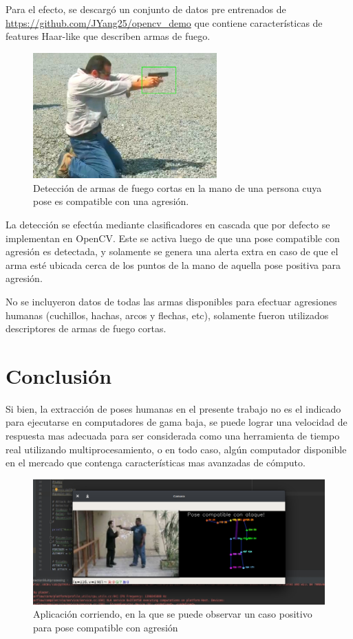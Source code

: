 \documentclass[a4paper,12pt,oneside,spanish]{book}
\begin{document}
Para el efecto, se descargó un conjunto de datos pre entrenados de \url{https://github.com/JYang25/opencv_demo} que contiene características de features Haar-like que describen armas de fuego.

\begin{figure}[h!]
	\includegraphics[width=200pt]{Imagenes/output2.jpg}
	\centering	
	\caption{Detección de armas de fuego cortas en la mano de una persona cuya pose es compatible con una agresión.}
	\label{fig:output2}
\end{figure}

La detección se efectúa mediante clasificadores en cascada que por defecto se implementan en OpenCV. Este se activa luego de que una pose compatible con agresión es detectada, y solamente se genera una alerta extra en caso de que el arma esté ubicada cerca de los puntos de la mano de aquella pose positiva para agresión.\par

No se incluyeron datos de todas las armas disponibles para efectuar agresiones humanas (cuchillos, hachas, arcos y flechas, etc), solamente fueron utilizados descriptores de armas de fuego cortas.\par

\section{Conclusión}
Si bien, la extracción de poses humanas en el presente trabajo no es el indicado para ejecutarse en computadores de gama baja, se puede lograr una velocidad de respuesta mas adecuada para ser considerada como una herramienta de tiempo real utilizando multiprocesamiento, o en todo caso, algún computador disponible en el mercado que contenga características mas avanzadas de cómputo.\par

\begin{figure}[h!]
	\includegraphics[width=450pt]{Imagenes/output1.jpg}
	\centering	
	\caption{Aplicación corriendo, en la que se puede observar un caso positivo para pose compatible con agresión}
	\label{fig:output1}
\end{figure}
\end{document}
